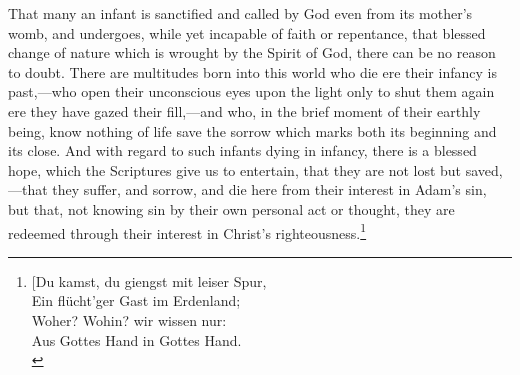 \documentclass[]{book}
\begin{document}
That many an infant is sanctified and called by God even from its mother's womb, and undergoes, while yet incapable of faith or repentance, that blessed change of nature which is wrought by the Spirit of God, there can be no reason to doubt. There are multitudes born into this world who die ere their infancy is past,---who open their unconscious eyes upon the light only to shut them again ere they have gazed their fill,---and who, in the brief moment of their earthly being, know nothing of life save the sorrow which marks both its beginning and its close. And with regard to such infants dying in infancy, there is a blessed hope, which the Scriptures give us to entertain, that they are not lost but saved,---that they suffer, and sorrow, and die here from their interest in Adam's sin, but that, not knowing sin by their own personal act or thought, they are redeemed through their interest in Christ's righteousness.\footnote{{[}Du kamst, du giengst mit leiser Spur,\\
  Ein flücht'ger Gast im Erdenland;\\
  Woher? Wohin? wir wissen nur:\\
  Aus Gottes Hand in Gottes Hand.\\
}
\end{document}
